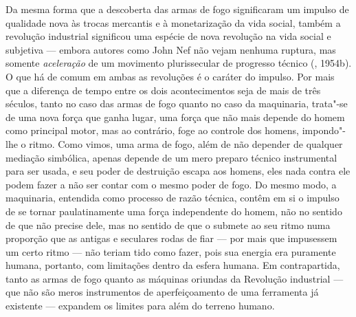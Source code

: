 Da mesma forma que a descoberta das armas de fogo significaram um
impulso de qualidade nova às trocas mercantis e à monetarização da vida
social, também a revolução industrial significou uma espécie de nova
revolução na vida social e subjetiva --- embora autores como John Nef não
vejam nenhuma ruptura, mas somente \emph{aceleração} de um movimento
plurissecular de progresso técnico (, 1954b). O que há de comum em
ambas as revoluções é o caráter do impulso. Por mais que a diferença de
tempo entre os dois acontecimentos seja de mais de três séculos, tanto
no caso das armas de fogo quanto no caso da maquinaria, trata"-se de uma
nova força que ganha lugar, uma força que não mais depende do homem como
principal motor, mas ao contrário, foge ao controle dos homens,
impondo"-lhe o ritmo. Como vimos, uma arma de fogo, além de não depender
de qualquer mediação simbólica, apenas depende de um mero preparo
técnico instrumental para ser usada, e seu poder de destruição escapa
aos homens, eles nada contra ele podem fazer a não ser contar com o
mesmo poder de fogo. Do mesmo modo, a maquinaria, entendida como
processo de razão técnica, contêm em si o impulso de se tornar
paulatinamente uma força independente do homem, não no sentido de que
não precise dele, mas no sentido de que o submete ao seu ritmo numa
proporção que as antigas e seculares rodas de fiar --- por mais que
impusessem um certo ritmo --- não teriam tido como fazer, pois sua
energia era puramente humana, portanto, com limitações dentro da esfera
humana. Em contrapartida, tanto as armas de fogo quanto as máquinas
oriundas da Revolução industrial --- que não são meros instrumentos de
aperfeiçoamento de uma ferramenta já existente --- expandem os limites
para além do terreno humano.


